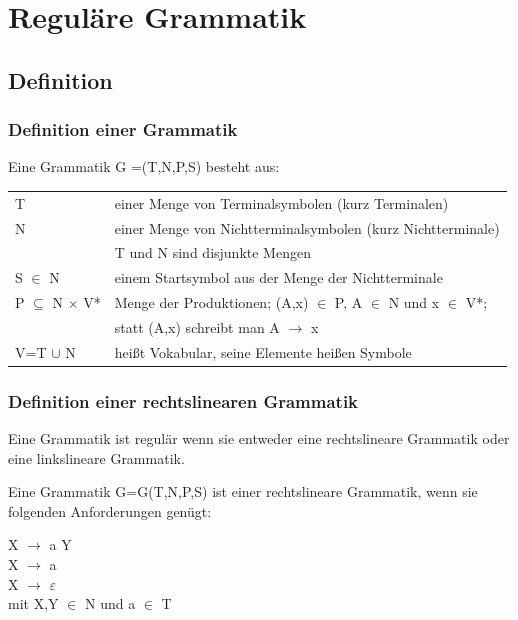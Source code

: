 \chapter{Reguläre Grammatik}

\section{Definition}

\subsection{Definition einer Grammatik}

Eine Grammatik G =(T,N,P,S) besteht aus:

\begin{tabular*}{1.0\textwidth}{l @{\extracolsep{\fill}} l}

T & einer Menge von Terminalsymbolen (kurz Terminalen)\\
N & einer Menge von Nichtterminalsymbolen (kurz Nichtterminale)\\
 & T und N sind disjunkte Mengen\\
 S $\in$ N & einem Startsymbol aus der Menge der Nichtterminale\\
 P $\subseteq$ N $\times$ V* & Menge der Produktionen; (A,x) $\in$ P, A $\in$ N
 und x $\in$ V*; \\
  & statt (A,x) schreibt man A $\rightarrow$ x\\
 V=T $\cup$ N & heißt Vokabular, seine Elemente heißen Symbole\\
 
\end{tabular*}

\subsection{Definition einer rechtslinearen Grammatik}

Eine Grammatik ist regulär wenn sie entweder eine rechtslineare Grammatik oder
eine linkslineare Grammatik.

Eine Grammatik G=G(T,N,P,S) ist einer rechtslineare Grammatik, wenn sie
folgenden Anforderungen genügt:

X $\rightarrow$ a Y \\
X $\rightarrow$ a \\
X $\rightarrow$ $\varepsilon$ \\
mit X,Y $\in$ N und a $\in$ T \\

